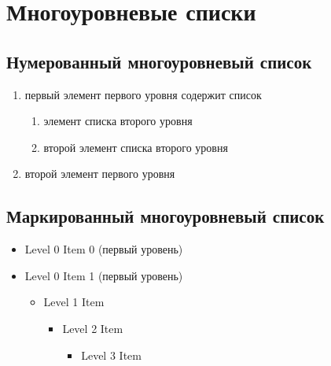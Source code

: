 \section{Многоуровневые списки}
\subsection{Нумерованный многоуровневый список}
\begin{enumerate} 
  \item первый элемент первого уровня содержит список 
    \begin{enumerate} 
        \item элемент списка второго уровня
        \item второй элемент списка второго уровня
    \end{enumerate} 
  \item  второй элемент первого уровня
\end{enumerate}

\subsection{Маркированный многоуровневый список}
\begin{itemize}
  \item Level 0 Item 0 (первый уровень)
  \item Level 0 Item 1 (первый уровень)
  \begin{itemize}
    \item Level 1 Item
    \begin{itemize}
      \item Level 2 Item
      \begin{itemize}
        \item Level 3 Item
      \end{itemize}
    \end{itemize}
  \end{itemize}
\end{itemize}
\clearpage